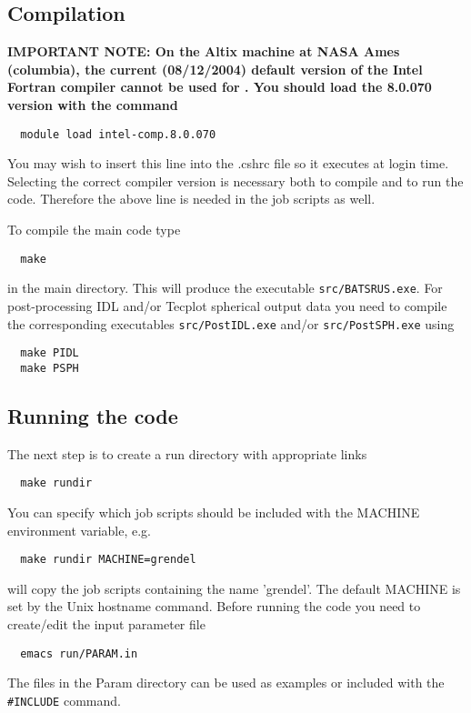 \subsection{Compilation}

{\bf IMPORTANT NOTE:
On the Altix machine at NASA Ames (columbia),
the current (08/12/2004) 
default version of the Intel Fortran compiler 
cannot be used for \BATSRUS. 
You should load the 8.0.070 version with the command
\begin{verbatim}
  module load intel-comp.8.0.070
\end{verbatim}
You may wish to insert this line into the .cshrc file
so it executes at login time. 
Selecting the correct compiler version is 
necessary both to compile and to run the code.
Therefore the above line is needed in the job scripts
as well.}

To compile the main code type
\begin{verbatim}
  make
\end{verbatim}
in the main directory. This will produce the executable 
{\tt src/BATSRUS.exe}. For post-processing IDL and/or 
Tecplot spherical output data 
you need to compile the corresponding executables {\tt src/PostIDL.exe}
and/or {\tt src/PostSPH.exe} using
\begin{verbatim}
  make PIDL
  make PSPH
\end{verbatim}

\subsection{Running the code}

The next step is to create a run directory with appropriate links
\begin{verbatim}
  make rundir
\end{verbatim}
You can specify which job scripts should be
included with the MACHINE environment variable, e.g.
\begin{verbatim}
  make rundir MACHINE=grendel
\end{verbatim}
will copy the job scripts containing the name 'grendel'.
The default MACHINE is set by the Unix hostname command.
Before running the code you need to create/edit the input
parameter file
\begin{verbatim}
  emacs run/PARAM.in
\end{verbatim}
The files in the Param directory can be used as examples or included
with the {\tt \#INCLUDE} command.

